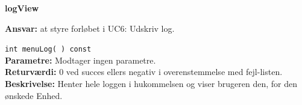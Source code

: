 {\centering
\textbf{logView}\par
}
\textbf{Ansvar:} at styre forløbet i UC6: Udskriv log. \

\verb+int menuLog( ) const+ \\
\textbf{Parametre:} Modtager ingen parametre. \\
\textbf{Returværdi:} 0 ved succes ellers negativ i overenstemmelse med fejl-listen. \\
\textbf{Beskrivelse:} Henter hele loggen i hukommelsen og viser brugeren den, for den ønskede Enhed.\\

